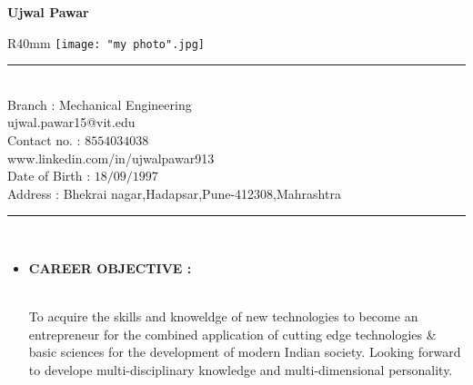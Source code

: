 \documentclass[11pt]{article}
\begin{document}
	
\begin{center}
	\begin{huge}
		\textbf{Ujwal Pawar}\\
	\end{huge}
\end{center}
\bigskip 	
\begin{wrapfigure}{R}{40mm}
	\centering
	\texttt{[image: "my photo".jpg]}
\end{wrapfigure}

\noindent\rule{6.5in}{0.4pt}\\
Branch : Mechanical Engineering\\
ujwal.pawar15@vit.edu\\
Contact no. : $8554034038$ \\      
www.linkedin.com/in/ujwalpawar913\\
Date of Birth : $18/09/1997$ \\
Address : Bhekrai nagar,Hadapsar,Pune-412308,Mahrashtra\\
\noindent\rule{6.5in}{0.4pt}\\

\begin{itemize}[label=$\star$]  
	\item \begin{large} \textbf{CAREER OBJECTIVE :} \end{large}\\
	
	To acquire the skills and knoweldge of new technologies to become an entrepreneur for the combined application of  cutting edge technologies \& basic sciences for the development of modern Indian society. Looking forward to develope multi-disciplinary knowledge and multi-dimensional personality.
\end{itemize}
\end{document}
